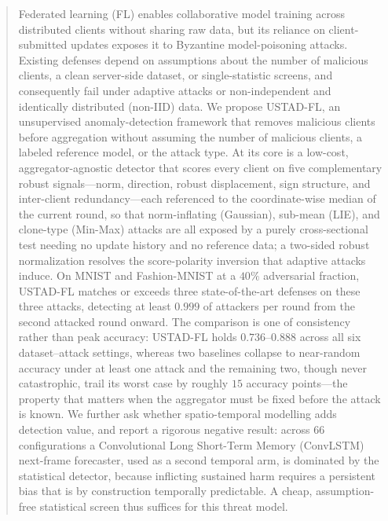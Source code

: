 \documentclass[journal]{IEEEtran}
\begin{document}
\begin{abstract}
Federated learning (FL) enables collaborative model training across distributed clients without sharing raw data, but its reliance on client-submitted updates exposes it to Byzantine model-poisoning attacks. Existing defenses depend on assumptions about the number of malicious clients, a clean server-side dataset, or single-statistic screens, and consequently fail under adaptive attacks or non-independent and identically distributed (non-IID) data. We propose USTAD-FL, an unsupervised anomaly-detection framework that removes malicious clients before aggregation without assuming the number of malicious clients, a labeled reference model, or the attack type. At its core is a low-cost, aggregator-agnostic detector that scores every client on five complementary robust signals---norm, direction, robust displacement, sign structure, and inter-client redundancy---each referenced to the coordinate-wise median of the current round, so that norm-inflating (Gaussian), sub-mean (LIE), and clone-type (Min-Max) attacks are all exposed by a purely cross-sectional test needing no update history and no reference data; a two-sided robust normalization resolves the score-polarity inversion that adaptive attacks induce. On MNIST and Fashion-MNIST at a $40\%$ adversarial fraction, USTAD-FL matches or exceeds three state-of-the-art defenses on these three attacks, detecting at least $0.999$ of attackers per round from the second attacked round onward. The comparison is one of consistency rather than peak accuracy: USTAD-FL holds $0.736$--$0.888$ across all six dataset--attack settings, whereas two baselines collapse to near-random accuracy under at least one attack and the remaining two, though never catastrophic, trail its worst case by roughly $15$ accuracy points---the property that matters when the aggregator must be fixed before the attack is known. We further ask whether spatio-temporal modelling adds detection value, and report a rigorous negative result: across $66$ configurations a Convolutional Long Short-Term Memory (ConvLSTM) next-frame forecaster, used as a second temporal arm, is dominated by the statistical detector, because inflicting sustained harm requires a persistent bias that is by construction temporally predictable. A cheap, assumption-free statistical screen thus suffices for this threat model.
\end{abstract}
\end{document}
